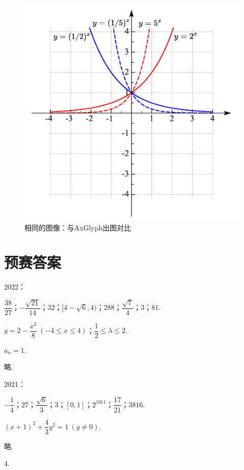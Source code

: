 \documentclass[cn,hazy,black,10pt,normal]{elegantnote}
\begin{document}
\begin{figure}[h!]
	\centering
	\includegraphics[width=12cm]{attachment/20230402viuuhjuu.pdf}
	\caption{相同的图像：与AxGlyph出图对比}
\end{figure}

\newpage
\section{预赛答案}

2022：

$\dfrac{38}{27}$；$-\dfrac{\sqrt{21}}{14}$；$32$；$[4-\sqrt{6},4)$；$288$；$\dfrac{\sqrt{7}}{4}$；$3$；$81$.

$y=2-\dfrac{x^2}{8}~(-4 \leq x \leq 4)$；$\dfrac{1}{2} \leq \lambda \leq 2$.

$a_n=1$.

略.

2021：

$-\dfrac{1}{4}$；$27$；$\dfrac{\sqrt{6}}{3}$；$3$；$[0,1]$；$2^{1011}$；$\dfrac{17}{21}$；$3816$.

$(x+1)^2+\dfrac{4}{3}y^2=1~(y \neq 0)$.

略.

$4$.
\end{document}
